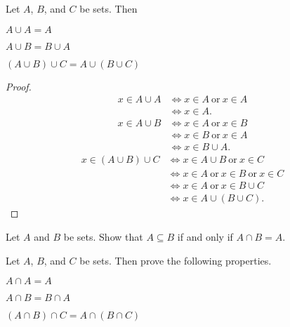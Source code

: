 \begin{prop}
Let $A$, $B$, and $C$ be sets.
Then
\begin{myEnum}
\item $A\cup A = A$\hfill{}
\item $A\cup B = B\cup A$\hfill{}
\item $(A\cup B)\cup C = A\cup(B\cup C)$\hfill{}
\end{myEnum}
\end{prop}
\begin{proof}
\begin{align*}
x\in A\cup A &\Leftrightarrow x\in A\ \text{or}\ x\in A\\
&\Leftrightarrow x\in A.
\end{align*}
\begin{align*}
x\in A\cup B &\Leftrightarrow x\in A\ \text{or}\ x\in B\\
&\Leftrightarrow  x\in B\ \text{or}\ x\in A\\
&\Leftrightarrow  x\in B \cup A.
\end{align*}
\begin{align*}
x\in (A\cup B)\cup C &\Leftrightarrow x\in A\cup B\ \text{or}\ x\in C\\
&\Leftrightarrow  x\in A\ \text{or}\ x\in B\ \text{or}\ x\in C\\
&\Leftrightarrow  x\in A\ \text{or}\ x\in B\cup C\\
&\Leftrightarrow  x\in A\cup(B \cup C).
\end{align*}
\end{proof}


\begin{hw}
Let $A$ and $B$ be sets.
Show that $A\subseteq B$ if and only if $A\cap B=A$.
\end{hw}


\begin{hw}
Let $A$, $B$, and $C$ be sets.
Then prove the following properties.
\begin{myEnum}
\item $A\cap A = A$\hfill{}
\item $A\cap B = B\cap A$\hfill{}
\item $(A\cap B)\cap C = A\cap(B\cap C)$\hfill{}
\end{myEnum}
\end{hw}



